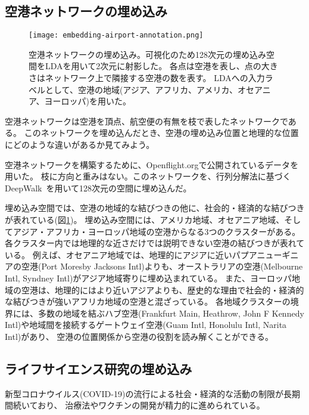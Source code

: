 \documentclass[J]{scitrans}
\begin{document}
\subsection{空港ネットワークの埋め込み}

\begin{figure}
    \centering
    \texttt{[image: embedding-airport-annotation.png]}
    \caption{
        空港ネットワークの埋め込み。可視化のため128次元の埋め込み空間をLDAを用いて2次元に射影した。
        各点は空港を表し、点の大きさはネットワーク上で隣接する空港の数を表す。
        LDAへの入力ラベルとして、空港の地域(アジア、アフリカ、アメリカ、オセアニア、ヨーロッパ)を用いた。
    }
    \label{fig:airport}
\end{figure}

空港ネットワークは空港を頂点、航空便の有無を枝で表したネットワークである。
このネットワークを埋め込んだとき、空港の埋め込み位置と地理的な位置にどのような違いがあるか見てみよう。

空港ネットワークを構築するために、Openflight.orgで公開されているデータ\cite{opsahl_2011}を用いた。
枝に方向と重みはない。このネットワークを、行列分解法に基づくDeepWalk~\cite{Qiu2018}を用いて128次元の空間に埋め込んだ。

埋め込み空間では、空港の地域的な結びつきの他に、社会的・経済的な結びつきが表れている(図\ref{fig:airport})。
埋め込み空間には、アメリカ地域、オセアニア地域、そしてアジア・アフリカ・ヨーロッパ地域の空港からなる3つのクラスターがある。
各クラスター内では地理的な近さだけでは説明できない空港の結びつきが表れている。
例えば、オセアニア地域では、地理的にアジアに近いパプアニューギニアの空港(Port Moresby Jacksons Intl)よりも、オーストラリアの空港(Melbourne Intl, Syndney Intl)がアジア地域寄りに埋め込まれている。
また、ヨーロッパ地域の空港は、地理的にはより近いアジアよりも、歴史的な理由で社会的・経済的な結びつきが強いアフリカ地域の空港と混ざっている。
各地域クラスターの境界には、多数の地域を結ぶハブ空港(Frankfurt Main, Heathrow, John F Kennedy Intl)や地域間を接続するゲートウェイ空港(Guam Intl, Honolulu Intl, Narita Intl)があり、
空港の位置関係から空港の役割を読み解くことができる。

\subsection{ライフサイエンス研究の埋め込み}

新型コロナウイルス(COVID-19)の流行による社会・経済的な活動の制限が長期間続いており、
治療法やワクチンの開発が精力的に進められている。
\end{document}
